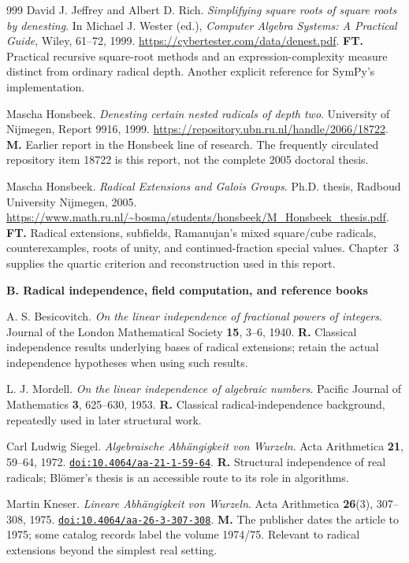 \documentclass[11pt,a4paper]{article}
\newcommand{\doi}[1]{\href{https://doi.org/#1}{\nolinkurl{doi:#1}}}
\let\sourceurl\url
\theoremstyle{definition}
\theoremstyle{remark}
\numberwithin{equation}{section}
\begin{document}
\begin{thebibliography}{999}
David J. Jeffrey and Albert D. Rich.
\emph{Simplifying square roots of square roots by denesting}.
In Michael J. Wester (ed.), \emph{Computer Algebra Systems: A Practical Guide}, Wiley, 61--72, 1999.
\sourceurl{https://cybertester.com/data/denest.pdf}.
\textbf{FT.} Practical recursive square-root methods and an expression-complexity measure distinct from ordinary radical depth. Another explicit reference for SymPy's implementation.

Mascha Honsbeek.
\emph{Denesting certain nested radicals of depth two}.
University of Nijmegen, Report 9916, 1999.
\sourceurl{https://repository.ubn.ru.nl/handle/2066/18722}.
\textbf{M.} Earlier report in the Honsbeek line of research. The frequently circulated repository item 18722 is this report, not the complete 2005 doctoral thesis.

Mascha Honsbeek.
\emph{Radical Extensions and Galois Groups}.
Ph.D. thesis, Radboud University Nijmegen, 2005.
\sourceurl{https://www.math.ru.nl/~bosma/students/honsbeek/M_Honsbeek_thesis.pdf}.
\textbf{FT.} Radical extensions, subfields, Ramanujan's mixed square/cube radicals, counterexamples, roots of unity, and continued-fraction special values. Chapter~3 supplies the quartic criterion and reconstruction used in this report.

\item[]\textbf{B. Radical independence, field computation, and reference books}

A. S. Besicovitch.
\emph{On the linear independence of fractional powers of integers}.
Journal of the London Mathematical Society \textbf{15}, 3--6, 1940.
\textbf{R.} Classical independence results underlying bases of radical extensions; retain the actual independence hypotheses when using such results.

L. J. Mordell.
\emph{On the linear independence of algebraic numbers}.
Pacific Journal of Mathematics \textbf{3}, 625--630, 1953.
\textbf{R.} Classical radical-independence background, repeatedly used in later structural work.

Carl Ludwig Siegel.
\emph{Algebraische Abh\"angigkeit von Wurzeln}.
Acta Arithmetica \textbf{21}, 59--64, 1972.
\doi{10.4064/aa-21-1-59-64}.
\textbf{R.} Structural independence of real radicals; Bl\"omer's thesis is an accessible route to its role in algorithms.

Martin Kneser.
\emph{Lineare Abh\"angigkeit von Wurzeln}.
Acta Arithmetica \textbf{26}(3), 307--308, 1975.
\doi{10.4064/aa-26-3-307-308}.
\textbf{M.} The publisher dates the article to 1975; some catalog records label the volume 1974/75. Relevant to radical extensions beyond the simplest real setting.


\end{thebibliography}
\end{document}
